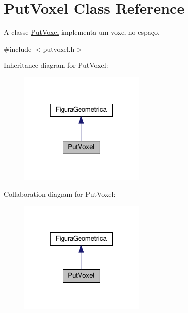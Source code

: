 \hypertarget{class_put_voxel}{}\section{Put\+Voxel Class Reference}
\label{class_put_voxel}


A classe \hyperlink{class_put_voxel}{Put\+Voxel} implementa um voxel no espaço.  




{\ttfamily \#include $<$putvoxel.\+h$>$}



Inheritance diagram for Put\+Voxel\+:
\nopagebreak
\begin{figure}[H]
\begin{center}
\leavevmode
\includegraphics[width=174pt]{class_put_voxel__inherit__graph}
\end{center}
\end{figure}


Collaboration diagram for Put\+Voxel\+:
\nopagebreak
\begin{figure}[H]
\begin{center}
\leavevmode
\includegraphics[width=174pt]{class_put_voxel__coll__graph}
\end{center}
\end{figure}
